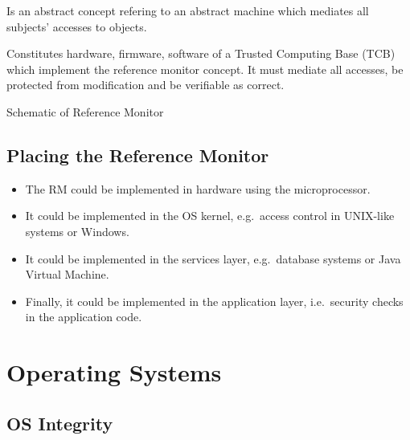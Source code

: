 \documentclass{beamer}
\begin{document}
\begin{frame}{\insertsubsectionhead}
  \begin{definition}
    Is an abstract concept refering to an abstract machine which mediates all 
    subjects' accesses to objects.
  \end{definition}
  \begin{definition}
    Constitutes hardware, firmware, software of a Trusted Computing Base (TCB) 
    which implement the reference monitor concept.
    It must mediate all accesses, be protected from modification and be 
    verifiable as correct.
  \end{definition}
\end{frame}

\begin{frame}{\insertsubsectionhead}{Schematic of Reference Monitor}
\end{frame}

\subsection{Placing the Reference Monitor}

\begin{frame}{\insertsubsectionhead}
  \begin{itemize}
    \item The RM could be implemented in hardware using the microprocessor.

    \item It could be implemented in the OS kernel, e.g.\ access control in 
      UNIX-like systems or Windows.

    \item It could be implemented in the services layer, e.g.\ database systems 
      or Java Virtual Machine.

    \item Finally, it could be implemented in the application layer, i.e.\ 
      security checks in the application code.

  \end{itemize}
\end{frame}


\section{Operating Systems}

\subsection{OS Integrity}
\end{document}
